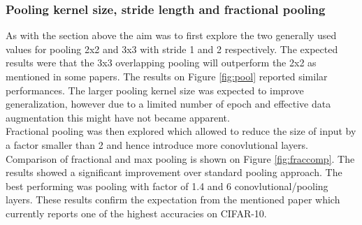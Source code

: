 \documentclass[12pt]{article}
\begin{document}
\subsubsection*{Pooling kernel size, stride length and fractional pooling}

As with the section above the aim was to first explore the two generally used values for pooling 2x2 and 3x3 with stride 1 and 2 respectively. The expected results were that the 3x3 overlapping pooling will outperform the 2x2 as mentioned in some papers\cite{inspiration}\cite{frac}. The results on Figure \ref{fig:pool} reported similar performances. The larger pooling kernel size was expected to improve generalization, however due to a limited number of epoch and effective data augmentation this might have not became apparent. 
\\


Fractional pooling\cite{frac} was then explored which allowed to reduce the size of input by a factor smaller than 2 and hence introduce more conovlutional layers. Comparison of fractional and max pooling is shown on Figure \ref{fig:fraccomp}. The results showed a significant improvement over standard pooling approach. The best performing was pooling with factor of 1.4 and 6 conovlutional/pooling layers. These results confirm the expectation from the mentioned paper which currently reports one of the highest accuracies on CIFAR-10.
\end{document}
